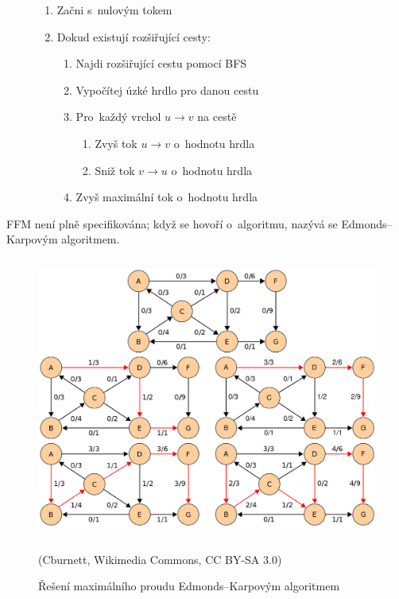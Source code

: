 \begin{figure}[ht]
    \onehalfspacing
    \begin{enumerate}
        \item Začni s~nulovým tokem
        \item Dokud existují rozšiřující cesty:
              \begin{enumerate}
                  \item Najdi rozšiřující cestu pomocí BFS
                  \item Vypočítej úzké hrdlo pro danou cestu
                  \item Pro~každý vrchol $u \rightarrow v$ na cestě
                        \begin{enumerate}
                            \item Zvyš tok $u \rightarrow v$ o~hodnotu hrdla
                            \item Sniž tok $v \rightarrow u$ o~hodnotu hrdla
                        \end{enumerate}
                  \item Zvyš maximální tok o~hodnotu hrdla
              \end{enumerate}
    \end{enumerate}
\end{figure}

FFM není plně specifikována; když se hovoří o~algoritmu, nazývá se Edmonds--Karpovým algoritmem.

\begin{figure}[ht]
    \centering
    \includegraphics[height=25em]{images/5_edmonds-karp}
    \caption{Řešení maximálního proudu Edmonds--Karpovým algoritmem}
    {\small (Cburnett, Wikimedia Commons, CC BY-SA 3.0)}
\end{figure}
\FloatBarrier

